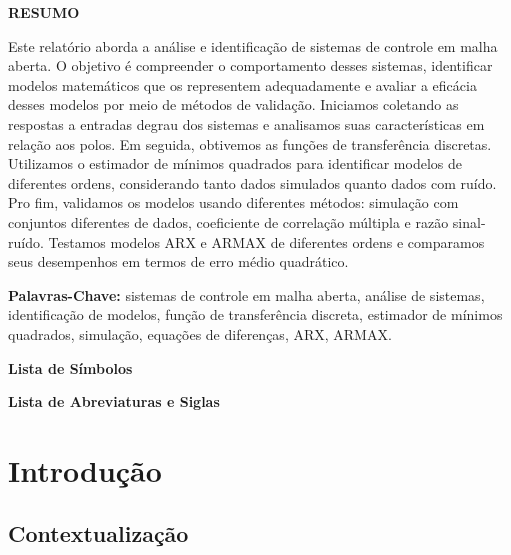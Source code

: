 \documentclass[a4paper,12pt]{article}
\begin{document}
\newpage
\thispagestyle{empty}
\begin{center}
    \large
    \textbf{RESUMO}
\end{center}
Este relatório aborda a análise e identificação de sistemas de controle em malha aberta. O objetivo é compreender o comportamento desses sistemas, identificar modelos matemáticos que os representem adequadamente e avaliar a eficácia desses modelos por meio de métodos de validação. Iniciamos coletando as respostas a entradas degrau dos sistemas e analisamos suas características em relação aos polos. Em seguida, obtivemos as funções de transferência discretas. Utilizamos o estimador de mínimos quadrados para identificar modelos de diferentes ordens, considerando tanto dados simulados quanto dados com ruído. Pro fim, validamos os modelos usando diferentes métodos: simulação com conjuntos diferentes de dados, coeficiente de correlação múltipla e razão sinal-ruído. Testamos modelos ARX e ARMAX de diferentes ordens e comparamos seus desempenhos em termos de erro médio quadrático.

\vspace{1cm}
\noindent\textbf{Palavras-Chave:} sistemas de controle em malha aberta, análise de sistemas, identificação de modelos, função de transferência discreta, estimador de mínimos quadrados, simulação, equações de diferenças, ARX, ARMAX.

\newpage
\thispagestyle{empty}
\begin{flushleft}
\Large
\textbf{Lista de Símbolos}
\end{flushleft}



\newpage
\thispagestyle{empty}
\begin{flushleft}
\Large
\textbf{Lista de Abreviaturas e Siglas}
\end{flushleft}

\newpage
\onehalfspacing
\thispagestyle{empty}
\listoffigures

\newpage
\onehalfspacing
\thispagestyle{empty}
\lstlistoflistings

\newpage
\thispagestyle{empty}
\tableofcontents

\newpage
\onehalfspacing
\section{Introdução}
    \subsection{Contextualização}
    
\end{document}
